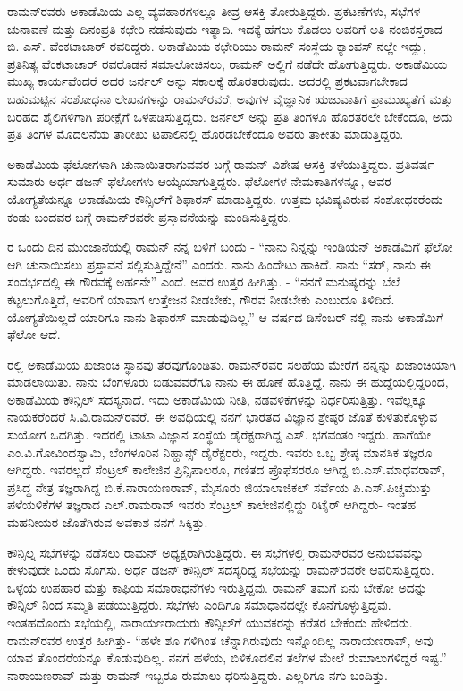 ರಾಮನ್‍ರವರು ಅಕಾಡೆಮಿಯ ಎಲ್ಲ ವ್ಯವಹಾರಗಳಲ್ಲೂ ತೀವ್ರ ಆಸಕ್ತಿ ತೋರುತ್ತಿದ್ದರು. ಪ್ರಕಟಣೆಗಳು, ಸಭೆಗಳ ಚುನಾವಣೆ ಮತ್ತು ದಿನಂಪ್ರತಿ ಕಛೇರಿ ನಡೆಸುವುದು ಇತ್ಯಾದಿ. ಇದಕ್ಕೆ ಹೆಗಲು ಕೊಡಲು ಅವರಿಗೆ ಅತಿ ನಂಬಿಕಸ್ತರಾದ ಬಿ. ಎಸ್. ವೆಂಕಟಾಚಾರ್ ರವರಿದ್ದರು. ಅಕಾಡೆಮಿಯ ಕಛೇರಿಯು ರಾಮನ್ ಸಂಸ್ಥೆಯ ಕ್ಯಾಂಪಸ್ ನಲ್ಲೇ ಇದ್ದು, ಪ್ರತಿನಿತ್ಯ ವೆಂಕಟಾಚಾರ್ ರವರೊಡನೆ ಸಮಾಲೋಚಿಸಲು, ರಾಮನ್ ಅಲ್ಲಿಗೆ ನಡೆದೇ ಹೋಗುತ್ತಿದ್ದರು. ಅಕಾಡೆಮಿಯ ಮುಖ್ಯ ಕಾರ್ಯವೆಂದರೆ ಅದರ ಜರ್ನಲ್  ಅನ್ನು ಸಕಾಲಕ್ಕೆ ಹೊರತರುವುದು. ಅದರಲ್ಲಿ ಪ್ರಕಟವಾಗಬೇಕಾದ ಬಹುಮಟ್ಟಿನ ಸಂಶೋಧನಾ ಲೇಖನಗಳನ್ನು ರಾಮನ್‍ರವರೆ, ಅವುಗಳ ವೈಜ್ಞಾನಿಕ ಋಜುವಾತಿಗೆ ಪ್ರಾಮುಖ್ಯತೆಗೆ ಮತ್ತು ಬರಹದ ಶೈಲಿಗಳಿಗಾಗಿ ಪರೀಕ್ಷೆಗೆ ಒಳಪಡಿಸುತ್ತಿದ್ದರು. ಜರ್ನಲ್ ಅನ್ನು ಪ್ರತಿ ತಿಂಗಳೂ ಹೊರತರಲೇ ಬೇಕೆಂದೂ, ಅದು ಪ್ರತಿ ತಿಂಗಳ ಮೊದಲನೆಯ ತಾರೀಖು ಟಪಾಲಿನಲ್ಲಿ ಹೊರಡಬೇಕೆಂದೂ ಅವರು ತಾಕೀತು ಮಾಡುತ್ತಿದ್ದರು.

ಅಕಾಡೆಮಿಯ ಫೆಲೋಗಳಾಗಿ ಚುನಾಯಿತರಾಗುವವರ ಬಗ್ಗೆ ರಾಮನ್ ವಿಶೇಷ ಆಸಕ್ತಿ ತಳೆಯುತ್ತಿದ್ದರು. ಪ್ರತಿವರ್ಷ ಸುಮಾರು ಅರ್ಧ ಡಜನ್ ಫೆಲೋಗಳು ಆಯ್ಕೆಯಾಗುತ್ತಿದ್ದರು. ಫೆಲೋಗಳ ನೇಮಕಾತಿಗಳನ್ನೂ, ಅವರ ಯೋಗ್ಯತೆಯನ್ನೂ ಅಕಾಡೆಮಿಯ ಕೌನ್ಸಿಲ್‍ಗೆ ಶಿಫಾರಸ್ ಮಾಡುತ್ತಿದ್ದರು. ಉತ್ತಮ ಭವಿಷ್ಯವಿರುವ ಸಂಶೋಧಕರೆಂದು ಕಂಡು ಬಂದವರ ಬಗ್ಗೆ ರಾಮನ್‍ರವರೇ ಪ್ರಸ್ತಾವನೆಯನ್ನು ಮಂಡಿಸುತ್ತಿದ್ದರು.

ರ ಒಂದು ದಿನ ಮುಂಜಾನೆಯಲ್ಲಿ ರಾಮನ್ ನನ್ನ ಬಳಿಗೆ ಬಂದು - “ನಾನು ನಿನ್ನನ್ನು ಇಂಡಿಯನ್ ಅಕಾಡೆಮಿಗೆ ಫೆಲೋ ಆಗಿ ಚುನಾಯಿಸಲು ಪ್ರಸ್ತಾವನೆ ಸಲ್ಲಿಸುತ್ತಿದ್ದೇನೆ” ಎಂದರು. ನಾನು ಹಿಂದೇಟು ಹಾಕಿದೆ. ನಾನು “ಸರ್, ನಾನು ಈ ಸಂದರ್ಭದಲ್ಲಿ ಈ ಗೌರವಕ್ಕೆ ಅರ್ಹನೇ” ಎಂದೆ. ಅವರ ಉತ್ತರ ಹೀಗಿತ್ತು. - “ನನಗೆ ಮನುಷ್ಯರನ್ನು ಬೆಲೆ ಕಟ್ಟಲುಗೊತ್ತಿದೆ, ಅವರಿಗೆ ಯಾವಾಗ ಉತ್ತೇಜನ ನೀಡಬೇಕು, ಗೌರವ ನೀಡಬೇಕು ಎಂಬುದೂ ತಿಳಿದಿದೆ. ಯೋಗ್ಯತೆಯಿಲ್ಲದೆ ಯಾರಿಗೂ ನಾನು ಶಿಫಾರಸ್ ಮಾಡುವುದಿಲ್ಲ.” ಆ ವರ್ಷದ ಡಿಸೆಂಬರ್ ನಲ್ಲಿ ನಾನು ಅಕಾಡೆಮಿಗೆ ಫೆಲೋ ಆದೆ.

ರಲ್ಲಿ ಅಕಾಡೆಮಿಯ ಖಜಾಂಚಿ ಸ್ಥಾನವು ತೆರವುಗೊಂಡಿತು. ರಾಮನ್‍ರವರ ಸಲಹೆಯ ಮೇರೆಗೆ ನನ್ನನ್ನು ಖಜಾಂಚಿಯಾಗಿ ಮಾಡಲಾಯಿತು. ನಾನು ಬೆಂಗಳೂರು ಬಿಡುವವರೆಗೂ ನಾನು ಈ ಹೊಣೆ ಹೊತ್ತಿದ್ದೆ. ನಾನು ಈ ಹುದ್ದೆಯಲ್ಲಿದ್ದರಿಂದ, ಅಕಾಡೆಮಿಯ ಕೌನ್ಸಿಲ್ ಸದಸ್ಯನಾದೆ. ಇದು ಅಕಾಡೆಮಿಯ ನೀತಿ, ನಡವಳಿಕೆಗಳನ್ನು ನಿರ್ಧರಿಸುತ್ತಿತ್ತು. ಇವೆಲ್ಲಕ್ಕೂ ನಾಯಕರೆಂದರೆ ಸಿ.ವಿ.ರಾಮನ್‍ರವರೆ. ಈ ಅವಧಿಯಲ್ಲಿ ನನಗೆ ಭಾರತದ ವಿಜ್ಞಾನ ಶ್ರೇಷ್ಠರ ಜೊತೆ ಕುಳಿತುಕೊಳ್ಳುವ ಸುಯೋಗ ಒದಗಿತ್ತು. ಇದರಲ್ಲಿ ಟಾಟಾ ವಿಜ್ಞಾನ ಸಂಸ್ಥೆಯ ಡೈರೆಕ್ಟರಾಗಿದ್ದ ಎಸ್. ಭಗವಂತಂ ಇದ್ದರು. ಹಾಗೆಯೇ ಎಂ.ವಿ.ಗೋವಿಂದಸ್ವಾಮಿ, ಬೆಂಗಳೂರಿನ ನಿಹ್ಹಾನ್ಸ್ ಡೈರೆಕ್ಟರರು, ಇದ್ದರು. ಇವರು ಒಬ್ಬ ಶ್ರೇಷ್ಠ ಮಾನಸಿಕ ತಜ್ಞರೂ ಆಗಿದ್ದರು. ಇವರಲ್ಲದೆ ಸೆಂಟ್ರಲ್ ಕಾಲೇಜಿನ ಪ್ರಿನ್ಸಿಪಾಲರೂ, ಗಣಿತದ ಪ್ರೊಫೆಸರರೂ ಆಗಿದ್ದ ಬಿ.ಎಸ್.ಮಾಧವರಾವ್, ಪ್ರಸಿದ್ಧ ನೇತ್ರ ತಜ್ಞರಾಗಿದ್ದ ಬಿ.ಕೆ.ನಾರಾಯಣರಾವ್, ಮೈಸೂರು ಜಿಯಾಲಾಜಿಕಲ್ ಸರ್ವೆಯ ಪಿ.ಎಸ್.ಪಿಚ್ಚಮುತ್ತು ಪಳೆಯಳಿಕೆಗಳ ತಜ್ಞರಾದ ಎಲ್.ರಾಮರಾವ್ ಇವರು ಸೆಂಟ್ರಲ್ ಕಾಲೇಜಿನಲ್ಲಿದ್ದು ರಿಟೈರ್ ಆಗಿದ್ದರು- ಇಂತಹ ಮಹನೀಯರ ಜೊತೆಗಿರುವ ಅವಕಾಶ ನನಗೆ ಸಿಕ್ಕಿತ್ತು.

ಕೌನ್ಸಿಲ್ನ ಸಭೆಗಳನ್ನು ನಡೆಸಲು ರಾಮನ್ ಅಧ್ಯಕ್ಷರಾಗಿರುತ್ತಿದ್ದರು. ಈ ಸಭೆಗಳಲ್ಲಿ ರಾಮನ್‍ರವರ ಅನುಭವವನ್ನು ಕೇಳುವುದೇ ಒಂದು ಸೊಗಸು. ಅರ್ಧ ಡಜನ್ ಕೌನ್ಸಿಲ್ ಸದಸ್ಯರಿದ್ದ ಸಭೆಯನ್ನು ರಾಮನ್‍ರವರೇ ಆವರಿಸುತ್ತಿದ್ದರು. ಒಳ್ಳೆಯ ಉಪಹಾರ ಮತ್ತು ಕಾಫಿಯ ಸಮಾರಾಧನೆಗಳು ಇರುತ್ತಿದ್ದವು. ರಾಮನ್ ತಮಗೆ ಏನು ಬೇಕೋ ಅದನ್ನು ಕೌನ್ಸಿಲ್ ನಿಂದ ಸಮ್ಮತಿ ಪಡೆಯುತ್ತಿದ್ದರು. ಸಭೆಗಳು ಎಂದಿಗೂ ಸಮಾಧಾನದಲ್ಲೇ ಕೊನೆಗೊಳ್ಳುತ್ತಿದ್ದವು. ಇಂತಹದೊಂದು ಸಭೆಯಲ್ಲಿ, ನಾರಾಯಣರಾಯರು ಕೌನ್ಸಿಲ್‍ಗೆ ಯುವಕರನ್ನು ಕರೆತರ ಬೇಕೆಂದು ಹೇಳಿದರು. ರಾಮನ್‍ರವರ ಉತ್ತರ ಹೀಗಿತ್ತು- “ಹಳೇ ಶೂ ಗಳಿಗಿಂತ ಚೆನ್ನಾಗಿರುವುದು ಇನ್ನೊಂದಿಲ್ಲ ನಾರಾಯಣರಾವ್, ಅವು ಯಾವ ತೊಂದರೆಯನ್ನೂ ಕೊಡುವುದಿಲ್ಲ. ನನಗೆ ಹಳೆಯ, ಬಿಳಿಕೂದಲಿನ ತಲೆಗಳ ಮೇಲೆ ರುಮಾಲುಗಳಿದ್ದರೆ ಇಷ್ಟ.” ನಾರಾಯಣರಾವ್ ಮತ್ತು ರಾಮನ್ ಇಬ್ಬರೂ ರುಮಾಲು ಧರಿಸುತ್ತಿದ್ದರು. ಎಲ್ಲರಿಗೂ ನಗು ಬಂದಿತ್ತು.

